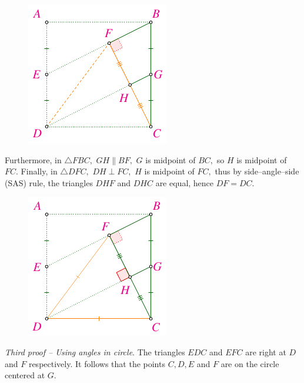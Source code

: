 \begin{multicols}{2}
\begin{figure}[H]
		\includegraphics[width= 0.65\linewidth]{2022-2-ms-1-1-d.pdf}
		\vspace*{-5pt}
	\end{figure}	
	Furthermore, in $\triangle FBC,$ $GH \parallel BF,$ $G$ is midpoint of $BC,$
	so $H$ is midpoint of $FC.$
	Finally, in $\triangle DFC,$ $DH \perp FC,$ $H$ is midpoint of $FC,$
	thus by side--angle--side (SAS) rule, the triangles $ DHF$ and $DHC$ are equal, hence $DF = DC.$
	\begin{figure}[H]
		\vspace*{-10pt}
		\centering
		\captionsetup{labelformat= empty, justification=centering}
		\includegraphics[width= 0.65\linewidth]{2022-2-ms-1-1-e.pdf}
		\vspace*{-15pt}
	\end{figure}		
	\textit{Third proof -- Using angles in circle}.
	The triangles $EDC$ and $ EFC$ are right at $D$ and $F$ respectively. It follows that the points $C, D, E$ and $F$ are on the circle centered at $G.$

\end{multicols}
